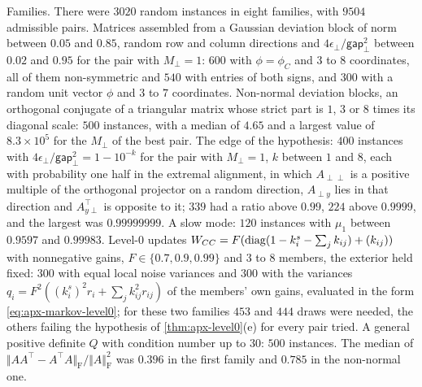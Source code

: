 \begin{numcheck}
Families. There were $3020$ random instances in eight families, with $9504$ admissible pairs. Matrices assembled from a Gaussian deviation block of norm between $0.05$ and $0.85$, random row and column directions and $4\epsilon_\perp/\mathsf{gap}_\perp^2$ between $0.02$ and $0.95$ for the pair with $M_\perp=1$: $600$ with $\phi=\phi_C$ and $3$ to $8$ coordinates, all of them non-symmetric and $540$ with entries of both signs, and $300$ with a random unit vector $\phi$ and $3$ to $7$ coordinates. Non-normal deviation blocks, an orthogonal conjugate of a triangular matrix whose strict part is $1$, $3$ or $8$ times its diagonal scale: $500$ instances, with a median of $4.65$ and a largest value of $8.3\times10^5$ for the $M_\perp$ of the best pair. The edge of the hypothesis: $400$ instances with $4\epsilon_\perp/\mathsf{gap}_\perp^2=1-10^{-k}$ for the pair with $M_\perp=1$, $k$ between $1$ and $8$, each with probability one half in the extremal alignment, in which $A_{\perp\perp}$ is a positive multiple of the orthogonal projector on a random direction, $A_{\perp y}$ lies in that direction and $A_{y\perp}^\top$ is opposite to it; $339$ had a ratio above $0.99$, $224$ above $0.9999$, and the largest was $0.99999999$. A slow mode: $120$ instances with $\mu_1$ between $0.9597$ and $0.99983$. Level-0 updates $W_{CC}=F(\operatorname{diag}(1-k^s_i-\sum_jk_{ij})+(k_{ij}))$ with nonnegative gains, $F\in\{0.7,0.9,0.99\}$ and $3$ to $8$ members, the exterior held fixed: $300$ with equal local noise variances and $300$ with the variances $q_i=F^2((k^s_i)^2r_i+\sum_jk_{ij}^2r_{ij})$ of the members' own gains, evaluated in the form \eqref{eq:apx-markov-level0}; for these two families $453$ and $444$ draws were needed, the others failing the hypothesis of \cref{thm:apx-level0}(e) for every pair tried. A general positive definite $Q$ with condition number up to $30$: $500$ instances. The median of $\Vert AA^\top-A^\top A\Vert_{\mathrm F}/\Vert A\Vert_{\mathrm F}^2$ was $0.396$ in the first family and $0.785$ in the non-normal one.


\end{numcheck}
